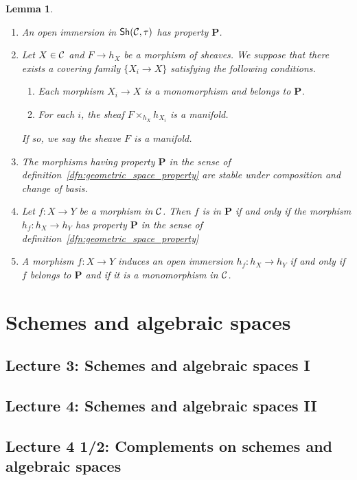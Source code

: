\documentclass{tufte-book} %
\numberwithin{dummy}{section}
\newtheorem{lemma}[thm]{Lemma}
\newcommand{\calc}{{\cal C}}
\newcommand{\lrta}{\longrightarrow}
\newcommand{\ssh}{\mathsf{Sh}}
\newcommand{\bfp}{\mathbf{P}}
\begin{document}
\begin{lemma}
\ 
\begin{enumerate}
\item An open immersion in $\ssh(\calc,\tau)$ has property $\bfp$.
\item Let $X\in\calc$ and $F\lrta h_X$ be a morphism of sheaves. We suppose that there exists a covering family $\{X_i\lrta X\}$ satisfying the following conditions.
\begin{enumerate}[label=(\alph*)]
\item Each morphism $X_i\lrta X$ is a monomorphism  and belongs to $\bfp$.
\item For each $i$, the sheaf $F\times_{h_X}h_{X_i}$ is a manifold.
\end{enumerate}
If so, we say the sheave $F$ is a manifold.
\item The morphisms having property $\bfp$ in the sense of definition~\ref{dfn:geometric_space_property} are stable under composition and change of basis.
\item Let $f:X\lrta Y$ be  a morphism in $\calc$. Then $f$ is in $\bfp$ if and only if the morphism $h_f:h_X\lrta h_Y$ has property $\bfp$ in the sense of definition~\ref{dfn:geometric_space_property}
\item A morphism $f:X\lrta Y$ induces an open immersion $h_f:h_X\lrta h_Y$ if and only if $f$ belongs to  $\bfp$ and if it is a monomorphism in $\calc$.
\end{enumerate}
\end{lemma}
\chapter{Schemes and algebraic spaces}
\section{Lecture 3: Schemes and algebraic spaces I}
\section{Lecture 4: Schemes and algebraic spaces II}
\section{Lecture 4 1/2: Complements on schemes and algebraic spaces}
\end{document}
